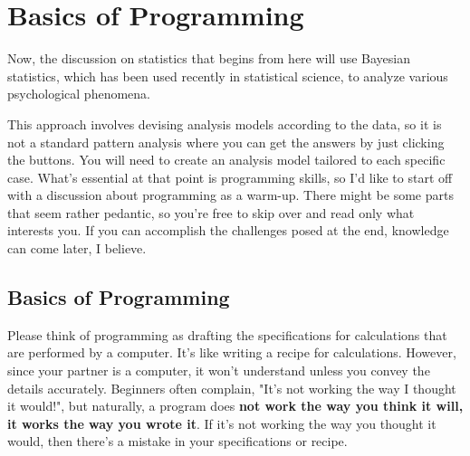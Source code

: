 \documentclass{ltjsbook}
\begin{document}
\chapter{Basics of Programming}
\label{x16_Programming}
Now, the discussion on statistics that begins from here will use Bayesian statistics, which has been used recently in statistical science, to analyze various psychological phenomena.

This approach involves devising analysis models according to the data, so it is not a standard pattern analysis where you can get the answers by just clicking the buttons. You will need to create an analysis model tailored to each specific case. What's essential at that point is programming skills, so I'd like to start off with a discussion about programming as a warm-up. There might be some parts that seem rather pedantic, so you're free to skip over and read only what interests you. If you can accomplish the challenges posed at the end, knowledge can come later, I believe.

\section{Basics of Programming}
Please think of programming as drafting the specifications for calculations that are performed by a computer. It's like writing a recipe for calculations. However, since your partner is a computer, it won't understand unless you convey the details accurately. Beginners often complain, "It's not working the way I thought it would!", but naturally, a program does \textbf{not work the way you think it will, it works the way you wrote it}. If it's not working the way you thought it would, then there's a mistake in your specifications or recipe.
\end{document}
